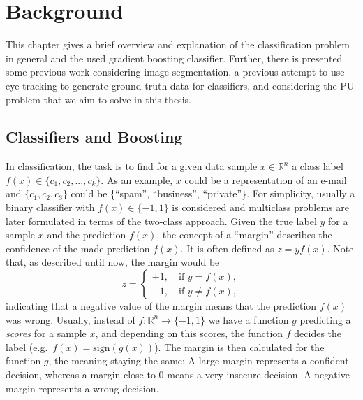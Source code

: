 \chapter{Background}
\label{chap:background}
This chapter gives a brief overview and explanation of the classification problem in general and the used gradient boosting classifier. Further, there is presented some previous work considering image segmentation, a previous attempt to use eye-tracking to generate ground truth data for classifiers, and considering the PU-problem that we aim to solve in this thesis.

\section{Classifiers and Boosting}
In classification, the task is to find for a given data sample $x \in \mathbb{R}^n$ a class label $f(x) \in \{c_1, c_2, ..., c_k\}$. As an example, $x$ could be a representation of an e-mail and $\{c_1,c_2,c_3\}$ could be \{``spam'', ``business'', ``private''\}. For simplicity, usually a binary classifier with $f(x) \in \{-1,1\}$ is considered and multiclass problems are later formulated in terms of the two-class approach. 
Given the true label $y$ for a sample $x$ and the prediction $f(x)$, the concept of a ``margin'' describes the confidence of the made prediction $f(x).$ 
It is often defined as $z = y f(x)$.
Note that, as described until now, the margin would be
\begin{equation*}
z = 
     \begin{cases}
	+1, \quad \text{if } y = f(x), \\
	-1, \quad \text{if } y \neq f(x),
      \end{cases}
\end{equation*}
indicating that a negative value of the margin means that the prediction $f(x)$ was wrong. Usually, instead of $f: \mathbb{R}^n \longrightarrow \{-1,1\}$ we have a function $g$ predicting a \emph{scores} for a sample $x$, and depending on this scores, the function $f$ decides the label (e.g.\ $f(x) = \text{sign}(g(x))$). The margin is then calculated for the function $g$, the meaning staying the same: A large margin represents a confident decision, whereas a margin close to $0$ means a very insecure decision. A negative margin represents a wrong decision.

